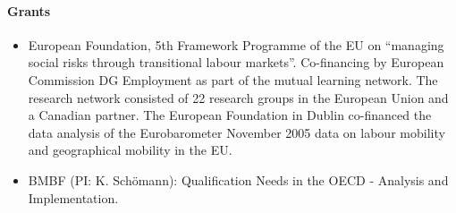 \begin{bibunit}[apalike]
\nocite{*}
\putbib[profKlausSchoemann]
\end{bibunit}

\paragraph{Grants}

\begin{itemize}
\item European Foundation, 5th Framework Programme of the EU on ``managing social risks through transitional labour markets''. Co-financing by European Commission DG Employment as part of the mutual learning network. The research network consisted of 22 research groups in the European Union and a Canadian partner. The European Foundation in Dublin co-financed the data analysis of the Eurobarometer November 2005 data on labour mobility and geographical mobility in the EU. 
\item BMBF (PI: K. Sch\"omann): Qualification Needs in the OECD - Analysis and Implementation.
\end{itemize}
